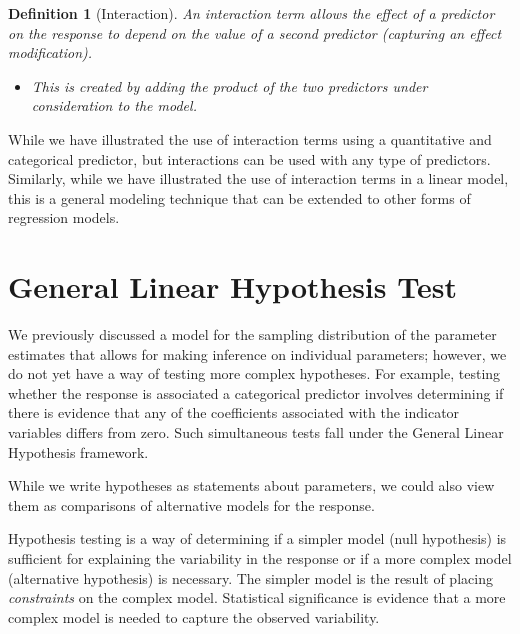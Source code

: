 \documentclass[
]{book}
\providecommand{\tightlist}{%
  \setlength{\itemsep}{0pt}\setlength{\parskip}{0pt}}
\theoremstyle{plain}
\theoremstyle{mydefn}
\newtheorem{definition}{Definition}[chapter]
\theoremstyle{myexmpl}
\theoremstyle{remark}
\begin{document}
\begin{definition}[Interaction]
\protect\hypertarget{def:defn-interaction}{}{\label{def:defn-interaction} {} }An interaction term allows the effect of a predictor on the response to depend on the value of a second predictor (capturing an effect modification).

\begin{itemize}
\tightlist
\item
  This is created by adding the product of the two predictors under consideration to the model.
\end{itemize}
\end{definition}

While we have illustrated the use of interaction terms using a quantitative and categorical predictor, but interactions can be used with any type of predictors. Similarly, while we have illustrated the use of interaction terms in a linear model, this is a general modeling technique that can be extended to other forms of regression models.

\hypertarget{glm-linear-hypotheses}{%
\chapter{General Linear Hypothesis Test}\label{glm-linear-hypotheses}}

We previously discussed a model for the sampling distribution of the parameter estimates that allows for making inference on individual parameters; however, we do not yet have a way of testing more complex hypotheses. For example, testing whether the response is associated a categorical predictor involves determining if there is evidence that any of the coefficients associated with the indicator variables differs from zero. Such simultaneous tests fall under the General Linear Hypothesis framework.

While we write hypotheses as statements about parameters, we could also view them as comparisons of alternative models for the response.

\begin{rmdkeyidea}
Hypothesis testing is a way of determining if a simpler model (null hypothesis) is sufficient for explaining the variability in the response or if a more complex model (alternative hypothesis) is necessary. The simpler model is the result of placing \emph{constraints} on the complex model. Statistical significance is evidence that a more complex model is needed to capture the observed variability.
\end{rmdkeyidea}
\end{document}
